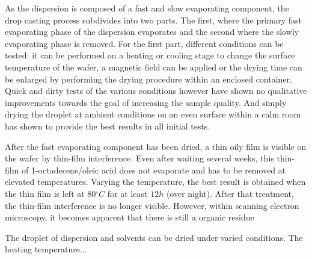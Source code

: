 \documentclass[\main/dresen_thesis.tex]{subfiles}
\begin{document}
  As the dispersion is composed of a fast and slow evaporating component, the drop casting process subdivides into two parts.
  The first, where the primary fast evaporating phase of the dispersion evaporates and the second where the slowly evaporating phase is removed.
  For the first part, different conditions can be tested: it can be performed on a heating or cooling stage to change the surface temperature of the wafer, a magnetic field can be applied or the drying time can be enlarged by performing the drying procedure within an enclosed container.
  Quick and dirty tests of the various conditions however have shown no qualitative improvements towards the goal of increasing the sample quality. 
  And simply drying the droplet at ambient conditions on an even surface within a calm room has shown to provide the best results in all initial tests.

  After the fast evaporating component has been dried, a thin oily film is visible on the wafer by thin-film interference.
  Even after waiting several weeks, this thin-film of 1-octadecene/oleic acid does not evaporate and has to be removed at elevated temperatures.
  Varying the temperature, the best result is obtained when the thin film is left at $80 \unit{^\circ C}$ for at least $12\unit{h}$ (over night).
  After that treatment, the thin-film interference is no longer visible.
  However, within scanning electron microscopy, it becomes apparent that there is still a organic residue


  The droplet of dispersion and solvents can be dried under varied conditions.
  The heating temperature...
\end{document}

